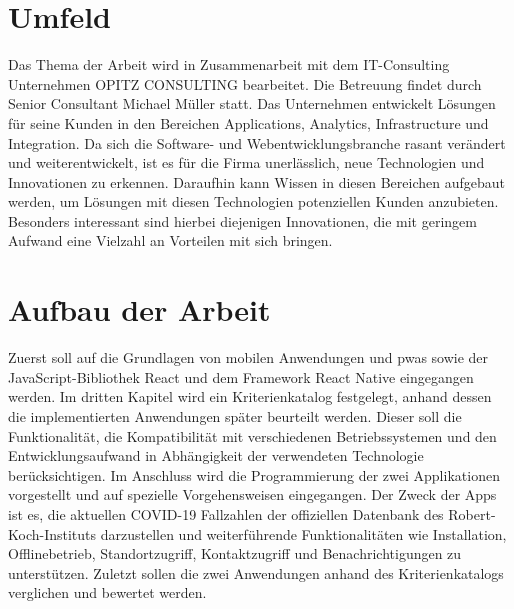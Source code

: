 \section{Umfeld}
Das Thema der Arbeit wird in Zusammenarbeit mit dem IT-Consulting Unternehmen OPITZ CONSULTING bearbeitet.
Die Betreuung findet durch Senior Consultant Michael Müller statt.
Das Unternehmen entwickelt Lösungen für seine Kunden in den Bereichen Applications, Analytics, Infrastructure und Integration.
Da sich die Software- und Webentwicklungsbranche rasant verändert und weiterentwickelt, ist es für die Firma unerlässlich, neue Technologien und Innovationen zu erkennen.
Daraufhin kann Wissen in diesen Bereichen aufgebaut werden, um Lösungen mit diesen Technologien potenziellen Kunden anzubieten.
Besonders interessant sind hierbei diejenigen Innovationen, die mit geringem Aufwand eine Vielzahl an Vorteilen mit sich bringen.

\section{Aufbau der Arbeit}
Zuerst soll auf die Grundlagen von mobilen Anwendungen und \acp{pwa} sowie der JavaScript-Bibliothek React und dem Framework React Native eingegangen werden.
Im dritten Kapitel wird ein Kriterienkatalog festgelegt, anhand dessen die implementierten Anwendungen später beurteilt werden.
Dieser soll die Funktionalität, die Kompatibilität mit verschiedenen Betriebssystemen und den Entwicklungsaufwand in Abhängigkeit der verwendeten Technologie berücksichtigen.
Im Anschluss wird die Programmierung der zwei Applikationen vorgestellt und auf spezielle Vorgehensweisen eingegangen.
Der Zweck der Apps ist es, die aktuellen COVID-19 Fallzahlen der offiziellen Datenbank des Robert-Koch-Instituts darzustellen und weiterführende Funktionalitäten wie Installation, Offlinebetrieb, Standortzugriff, Kontaktzugriff und Benachrichtigungen zu unterstützen.
Zuletzt sollen die zwei Anwendungen anhand des Kriterienkatalogs verglichen und bewertet werden.
